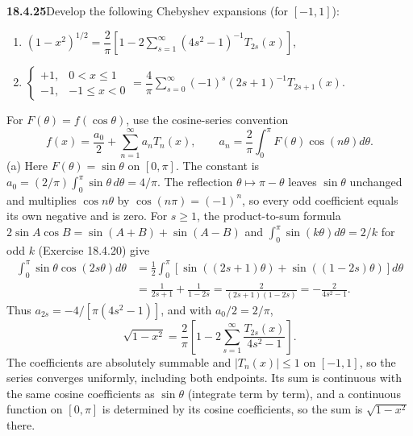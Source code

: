\par\bigskip
\noindent\textbf{18.4.25}\quad Develop the following Chebyshev
expansions (for $[-1,1]$):
\begin{enumerate}
\item[(a)] $(1-x^{2})^{1/2}=\dfrac{2}{\pi}\left[1-2
\displaystyle\sum_{s=1}^{\infty}(4s^{2}-1)^{-1}T_{2s}(x)\right]$,
\item[(b)] $\begin{cases}+1,&0<x\le1\\-1,&-1\le x<0\end{cases}
=\dfrac{4}{\pi}\displaystyle\sum_{s=0}^{\infty}
(-1)^{s}(2s+1)^{-1}T_{2s+1}(x)$.
\end{enumerate}
\solution
For $F(\theta)=f(\cos\theta)$, use the cosine-series convention
\[
f(x)=\frac{a_0}{2}+\sum_{n=1}^\infty a_nT_n(x),\qquad
 a_n=\frac2\pi\int_0^\pi F(\theta)\cos(n\theta)d\theta.
\]
(a) Here $F(\theta)=\sin\theta$ on $[0,\pi]$.
The constant is $a_0=(2/\pi)\int_0^\pi\sin\theta\,d\theta=4/\pi$.
The reflection $\theta\mapsto\pi-\theta$ leaves $\sin\theta$ unchanged
and multiplies $\cos n\theta$ by $\cos(n\pi)=(-1)^n$, so every odd
coefficient equals its own negative and is zero.
For $s\ge1$, the product-to-sum formula
$2\sin A\cos B=\sin(A+B)+\sin(A-B)$ and
$\int_0^\pi\sin(k\theta)d\theta=2/k$ for odd $k$
(Exercise 18.4.20) give
\begin{align*}
\int_0^\pi\sin\theta\cos(2s\theta)d\theta
 &=\frac12\int_0^\pi
  [\sin((2s+1)\theta)+\sin((1-2s)\theta)]d\theta\\
 &=\frac1{2s+1}+\frac1{1-2s}
  =\frac{2}{(2s+1)(1-2s)}=-\frac2{4s^2-1}.
\end{align*}
Thus $a_{2s}=-4/[\pi(4s^2-1)]$, and with $a_0/2=2/\pi$,
\[
\boxed{\sqrt{1-x^2}=\frac2\pi
 \left[1-2\sum_{s=1}^\infty\frac{T_{2s}(x)}{4s^2-1}\right]}.
\]
The coefficients are absolutely summable and $|T_n(x)|\le1$ on
$[-1,1]$, so the series converges uniformly, including both endpoints.
Its sum is continuous with the same cosine coefficients as
$\sin\theta$ (integrate term by term), and a continuous function on
$[0,\pi]$ is determined by its cosine coefficients, so the sum is
$\sqrt{1-x^2}$ there.

